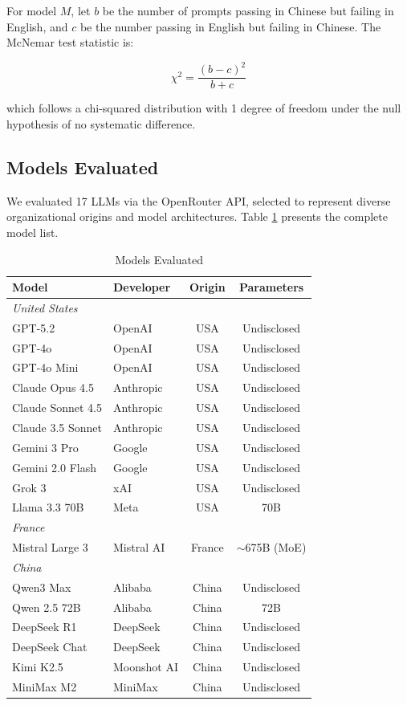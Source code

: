 \documentclass[11pt,a4paper]{article}
\begin{document}
For model $M$, let $b$ be the number of prompts passing in Chinese but failing in English, and $c$ be the number passing in English but failing in Chinese. The McNemar test statistic is:

\begin{equation}
    \chi^2 = \frac{(b - c)^2}{b + c}
\end{equation}

which follows a chi-squared distribution with 1 degree of freedom under the null hypothesis of no systematic difference.

\subsection{Models Evaluated}

We evaluated 17 LLMs via the OpenRouter API, selected to represent diverse organizational origins and model architectures. Table \ref{tab:models} presents the complete model list.

\begin{table}[H]
\centering
\caption{Models Evaluated}
\begin{tabular}{llcc}
\toprule
\textbf{Model} & \textbf{Developer} & \textbf{Origin} & \textbf{Parameters} \\
\midrule
\multicolumn{4}{l}{\textit{United States}} \\
GPT-5.2 & OpenAI & USA & Undisclosed \\
GPT-4o & OpenAI & USA & Undisclosed \\
GPT-4o Mini & OpenAI & USA & Undisclosed \\
Claude Opus 4.5 & Anthropic & USA & Undisclosed \\
Claude Sonnet 4.5 & Anthropic & USA & Undisclosed \\
Claude 3.5 Sonnet & Anthropic & USA & Undisclosed \\
Gemini 3 Pro & Google & USA & Undisclosed \\
Gemini 2.0 Flash & Google & USA & Undisclosed \\
Grok 3 & xAI & USA & Undisclosed \\
Llama 3.3 70B & Meta & USA & 70B \\
\multicolumn{4}{l}{\textit{France}} \\
Mistral Large 3 & Mistral AI & France & $\sim$675B (MoE) \\
\multicolumn{4}{l}{\textit{China}} \\
Qwen3 Max & Alibaba & China & Undisclosed \\
Qwen 2.5 72B & Alibaba & China & 72B \\
DeepSeek R1 & DeepSeek & China & Undisclosed \\
DeepSeek Chat & DeepSeek & China & Undisclosed \\
Kimi K2.5 & Moonshot AI & China & Undisclosed \\
MiniMax M2 & MiniMax & China & Undisclosed \\
\bottomrule
\end{tabular}
\label{tab:models}
\end{table}
\end{document}
